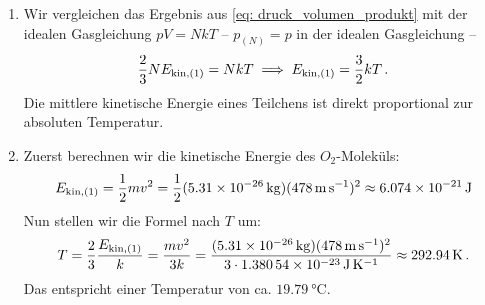 \documentclass[ngerman]{scrreprt}
\newenvironment{loesungbox}[1]
  {\needspace{5\baselineskip}\begin{loesungboxstyle}[frametitle={#1}]}
  {\end{loesungboxstyle}}
\begin{document}
\begin{loesungbox}{Lösung zu \Cref{aufg:druck_kraftuebertragung}}
\begin{enumerate}
    \item Wir vergleichen das Ergebnis aus \cref{eq: druck_volumen_produkt} mit der idealen Gasgleichung $pV = NkT$ -- $p_{(N)} = p$ in der idealen Gasgleichung --
    \begin{equation}
        \frac{2}{3} N E_{\mathrm{kin},(1)} = NkT \implies E_{\mathrm{kin},(1)} = \frac{3}{2}kT \,.
    \end{equation}
    Die mittlere kinetische Energie eines Teilchens ist direkt proportional zur absoluten Temperatur.
    
    \item Zuerst berechnen wir die kinetische Energie des $O_2$-Moleküls:
    \begin{equation}
        E_{\mathrm{kin}, (1)} = \frac{1}{2}m v^2 = \frac{1}{2}(\SI{5.31e-26}{\kilo\gram})(\SI{478}{\meter\per\second})^2 \approx \SI{6.074e-21}{\joule}
    \end{equation}
    Nun stellen wir die Formel nach $T$ um:
    \begin{equation}
        T = \frac{2}{3}\frac{E_{\mathrm{kin},(1)}}{k} = \frac{mv^2}{3k} = \frac{(\SI{5.31e-26}{\kilo\gram})(\SI{478}{\meter\per\second})^2}{3\cdot \SI{1.38054e-23}{\joule\per\kelvin}} \approx \SI{292.94}{\kelvin} \,.
    \end{equation}
    Das entspricht einer Temperatur von ca. $\SI{19.79}{\celsius}$.
\end{enumerate}
\end{loesungbox}
\end{document}
